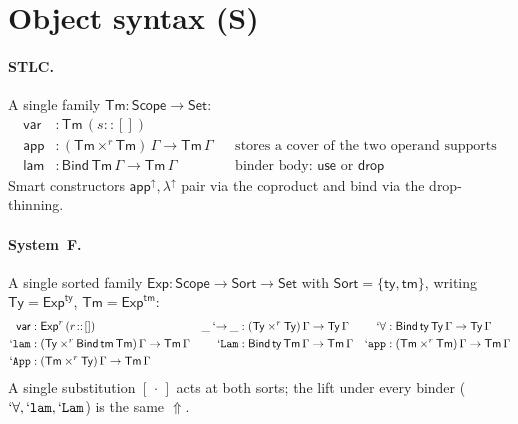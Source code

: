 \documentclass{article}
\newcommand{\Scope}{\mathsf{Scope}}
\newcommand{\appU}{\mathsf{app}^{{\uparrow}}}
\newcommand{\lamU}{\lambda^{{\uparrow}}}
\newcommand{\ins}[1]{[\,#1\,]}                      %
\newcommand{\Up}{\mathord{{\Uparrow}\!}}            %
\newcommand{\catS}{\textbf{(S)}}
\theoremstyle{plain}
\begin{document}
\section{Object syntax \hfill \catS}\label{sig:syntax}

\paragraph{STLC.} A single family $\mathsf{Tm} : \Scope\to\mathsf{Set}$:
\begin{align*}
  \mathsf{var} &: \mathsf{Tm}\,(s\!::\![])\\
  \mathsf{app} &: (\mathsf{Tm}\times^{r}\mathsf{Tm})\,\Gamma \to \mathsf{Tm}\,\Gamma
    && \text{stores a cover of the two operand supports}\\
  \mathsf{lam} &: \mathsf{Bind}\,\mathsf{Tm}\,\Gamma \to \mathsf{Tm}\,\Gamma
    && \text{binder body: } \mathsf{use}\text{ or }\mathsf{drop}
\end{align*}
Smart constructors $\appU,\lamU$ pair via the coproduct and bind via the
drop-thinning.

\paragraph{System~F.} A single sorted family
$\mathsf{Exp} : \Scope\to\mathsf{Sort}\to\mathsf{Set}$ with
$\mathsf{Sort}=\{\mathsf{ty},\mathsf{tm}\}$, writing
$\mathsf{Ty}=\mathsf{Exp}^{\mathsf{ty}}$, $\mathsf{Tm}=\mathsf{Exp}^{\mathsf{tm}}$:
\begin{align*}
  \mathsf{var}&: \mathsf{Exp}^{r}\,(r\!::\![])
  & \_\mathbin{\mathtt{`{\to}}}\_ &: (\mathsf{Ty}\times^{r}\mathsf{Ty})\,\Gamma\to\mathsf{Ty}\,\Gamma
  & \mathtt{`\forall}&: \mathsf{Bind}\,\mathsf{ty}\,\mathsf{Ty}\,\Gamma\to\mathsf{Ty}\,\Gamma\\
  \mathtt{`lam}&: (\mathsf{Ty}\times^{r}\mathsf{Bind}\,\mathsf{tm}\,\mathsf{Tm})\,\Gamma\to\mathsf{Tm}\,\Gamma
  & \mathtt{`Lam}&: \mathsf{Bind}\,\mathsf{ty}\,\mathsf{Tm}\,\Gamma\to\mathsf{Tm}\,\Gamma
  & \mathtt{`app}&: (\mathsf{Tm}\times^{r}\mathsf{Tm})\,\Gamma\to\mathsf{Tm}\,\Gamma\\
  \mathtt{`App}&: (\mathsf{Tm}\times^{r}\mathsf{Ty})\,\Gamma\to\mathsf{Tm}\,\Gamma
\end{align*}
A single substitution $\ins\cdot$ acts at both sorts; the lift under every binder
($\mathtt{`\forall},\mathtt{`lam},\mathtt{`Lam}$) is the same $\Up$.
\end{document}

